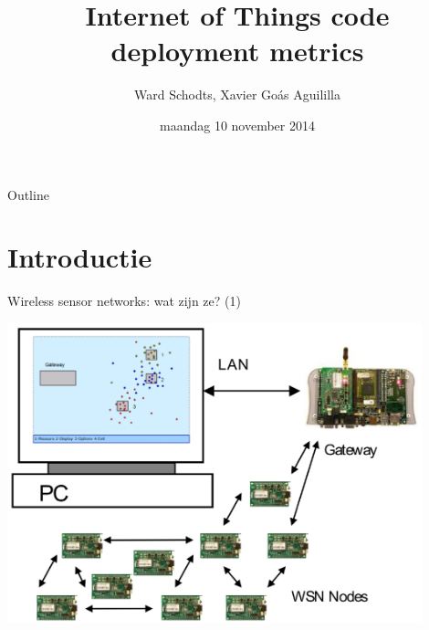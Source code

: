 \documentclass[presentation, bigger]{beamer}
\author{Ward Schodts, Xavier Goás Aguililla}
\date{maandag 10 november 2014}
\title{Internet of Things code deployment metrics}
\begin{document}
\maketitle
\begin{frame}{Outline}
\tableofcontents
\end{frame}



\section{Introductie}
\label{sec-1}
\begin{frame}[label=sec-1-1]{Wireless sensor networks: wat zijn ze? (1)}

\includegraphics[width=0.9\textwidth,keepaspectration=true]{intro/overview.png}

\end{frame}
\end{document}
